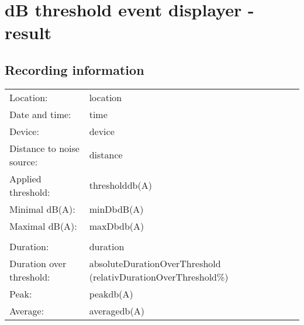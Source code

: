 \documentclass{article}
\begin{document}
\thispagestyle{empty}

\section*{dB threshold event displayer - result}

\subsection*{Recording information}

\begin{table}[h!]
    \begin{tabular}{p{4cm} p{4cm}}
        Location:                   & {{location}}      \\
        Date and time:              & {{time}}          \\
        Device:                     & {{device}}        \\
        Distance to noise source:   & {{distance}}      \\
        Applied threshold:          & {{threshold}}db(A)     \\
        Minimal dB(A):              & {{minDb}}dB(A)    \\
        Maximal dB(A):              & {{maxDb}}db(A)    \\
                                                        \\
        Duration:                   & {{duration}}      \\
        Duration over threshold:    & {{absoluteDurationOverThreshold}} ({{relativDurationOverThreshold}}\%) \\
        Peak:                       & {{peak}}db(A)  \\
        Average:                    & {{average}}db(A)  \\
    \end{tabular}
    \label{tab:table}
\end{table}

\begin{figure}[h!]
    \begin{center}
    \end{center}
    \label{fig:filtered-audio-values}
\end{figure}
\end{document}
